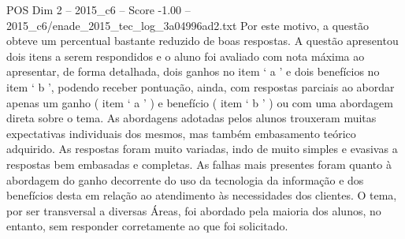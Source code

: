 \begin{textsample}{POS Dim 2 – 2015\_c6 – Score -1.00 – 2015\_c6/enade\_2015\_tec\_log\_3a04996ad2.txt}
Por este motivo, a questão obteve um percentual bastante reduzido de boas respostas.
A questão apresentou dois itens a serem respondidos e o aluno foi avaliado com nota máxima ao apresentar, de forma detalhada, dois ganhos no item ‘ a ’ e dois benefícios no item ‘ b ’, podendo receber pontuação, ainda, com respostas parciais ao abordar apenas um ganho ( item ‘ a ’ ) e benefício ( item ‘ b ’ ) ou com uma abordagem direta sobre o tema.
As abordagens adotadas pelos alunos trouxeram muitas expectativas individuais dos mesmos, mas também embasamento teórico adquirido.
As respostas foram muito variadas, indo de muito simples e evasivas a respostas bem embasadas e completas.
As falhas mais presentes foram quanto à abordagem do ganho decorrente do uso da tecnologia da informação e dos benefícios desta em relação ao atendimento às necessidades dos clientes.
O tema, por ser transversal a diversas Áreas, foi abordado pela maioria dos alunos, no entanto, sem responder corretamente ao que foi solicitado.

\end{textsample}
